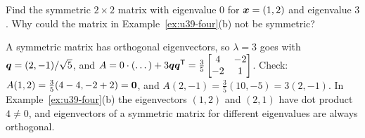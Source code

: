 \begin{exercise}\label{exr:u39-sym}
Find the symmetric $2\times2$ matrix with eigenvalue $0$ for $\boldsymbol{x}=(1,2)$ and eigenvalue $3$. Why could the matrix in Example~\ref{ex:u39-four}(b) not be symmetric?
\end{exercise}
\begin{solution}
A symmetric matrix has orthogonal eigenvectors, so $\lambda=3$ goes with $\boldsymbol{q}=(2,-1)/\sqrt5$, and $A=0\cdot(\dots)+3\boldsymbol{q}\boldsymbol{q}^{\mathsf{T}}=\frac35\begin{bmatrix}4&-2\\-2&1\end{bmatrix}$. Check: $A(1,2)=\frac35(4-4,-2+2)=\boldsymbol{0}$, and $A(2,-1)=\frac35(10,-5)=3(2,-1)$. In Example~\ref{ex:u39-four}(b) the eigenvectors $(1,2)$ and $(2,1)$ have dot product $4\neq0$, and eigenvectors of a symmetric matrix for different eigenvalues are always orthogonal.
\end{solution}
